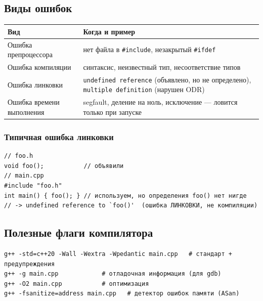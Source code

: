 \subsection{Виды ошибок}

\begin{center}
\begin{tabular}{lp{8.5cm}}
\toprule
\textbf{Вид} & \textbf{Когда и пример} \\
\midrule
Ошибка препроцессора & нет файла в \texttt{\#include}, незакрытый \texttt{\#ifdef} \\
\addlinespace
Ошибка компиляции & синтаксис, неизвестный тип, несоответствие типов \\
\addlinespace
Ошибка линковки & \texttt{undefined reference} (объявлено, но не определено), \texttt{multiple definition} (нарушен ODR) \\
\addlinespace
Ошибка времени выполнения & segfault, деление на ноль, исключение --- ловится только при запуске \\
\bottomrule
\end{tabular}
\end{center}

\subsubsection{Типичная ошибка линковки}

\begin{lstlisting}
// foo.h
void foo();           // объявили
// main.cpp
#include "foo.h"
int main() { foo(); } // используем, но определения foo() нет нигде
// -> undefined reference to `foo()'  (ошибка ЛИНКОВКИ, не компиляции)
\end{lstlisting}

\subsection{Полезные флаги компилятора}

\begin{lstlisting}
g++ -std=c++20 -Wall -Wextra -Wpedantic main.cpp   # стандарт + предупреждения
g++ -g main.cpp            # отладочная информация (для gdb)
g++ -O2 main.cpp           # оптимизация
g++ -fsanitize=address main.cpp   # детектор ошибок памяти (ASan)
\end{lstlisting}
